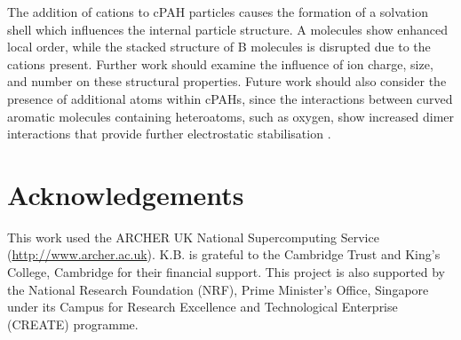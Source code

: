 The addition of cations to cPAH particles causes the formation of a solvation shell which influences the internal particle structure. A molecules show enhanced local order, while the stacked structure of B molecules is disrupted due to the cations present. Further work should examine the influence of ion charge, size, and number on these structural properties. Future work should also consider the presence of additional atoms within cPAHs, since the interactions between curved aromatic molecules containing heteroatoms, such as oxygen, show increased dimer interactions that provide further electrostatic stabilisation \cite{Cabaleiro-Lago2018}.  


\section*{Acknowledgements}
This work used the ARCHER UK National Supercomputing Service (\url{http://www.archer.ac.uk}).
K.B. is grateful to the Cambridge Trust and King's College, Cambridge for their financial support.
This project is also supported by the National Research Foundation (NRF), Prime Minister's Office, Singapore under its Campus for Research Excellence and Technological Enterprise (CREATE) programme.
